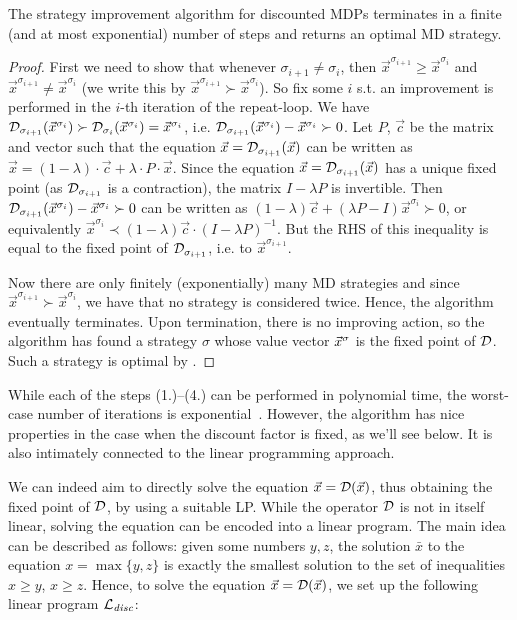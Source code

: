 \begin{theorem}
\label{5-thm:disc-strat-it}
The strategy improvement algorithm for discounted MDPs terminates in a finite (and at most exponential) number of steps and returns an optimal MD strategy.
\end{theorem}
\begin{proof}
First we need to show that whenever $\sigma_{i+1}\neq \sigma_i$, then  $\vec{x}^{\sigma_{i+1}} \geq \vec{x}^{\sigma_i}$ and $\vec{x}^{\sigma_{i+1}} \neq \vec{x}^{\sigma_i}$ (we write this by $\vec{x}^{\sigma_{i+1}} \succ\vec{x}^{\sigma_i}$). So fix some $ i $ s.t. an improvement is performed in the $ i $-th iteration of the repeat-loop. We have $\mathcal{D}_{\sigma_{i+1}}(\vec{x}^{\sigma_i})\succ\mathcal{D}_{\sigma_{i}}(\vec{x}^{\sigma_i})= \vec{x}^{\sigma_i}$, i.e. $\mathcal{D}_{\sigma_{i+1}}(\vec{x}^{\sigma_i})-\vec{x}^{\sigma_i} \succ 0$. Let $P$, $\vec{c}$ be the matrix and vector such that the equation $\vec{x}=\mathcal{D}_{\sigma_{i+1}}(\vec{x})$ can be written as $\vec{x}= (1-\lambda)\cdot \vec{c}+\lambda \cdot P\cdot\vec{x}$. Since the equation $\vec{x}=\mathcal{D}_{\sigma_{i+1}}(\vec{x})$ has a unique fixed point (as $ \mathcal{D}_{\sigma_{i+1}} $ is a contraction), the matrix $ I-\lambda P $ is invertible. Then $\mathcal{D}_{\sigma_{i+1}}(\vec{x}^{\sigma_i})-\vec{x}^{\sigma_i} \succ 0$ can be written as  $(1-\lambda)\vec{c} + (\lambda P - I)\vec{x}^{\sigma_i} \succ 0 $, or equivalently $\vec{x}^{\sigma_i}\prec (1-\lambda)\vec{c}\cdot(I-\lambda P)^{-1}.$ But the RHS of this inequality is equal to the fixed point of $\mathcal{D}_{\sigma_{i+1}}$, i.e. to $\vec{x}^{\sigma_{i+1}} .$

Now there are only finitely (exponentially) many MD strategies and since$\vec{x}^{\sigma_{i+1}} \succ\vec{x}^{\sigma_i}$, we have that no strategy is considered twice. Hence, the algorithm eventually terminates. Upon termination, there is no improving action, so the algorithm has found a strategy $\sigma$ whose value vector $\vec{x}^{\sigma}$ is the fixed point of $\mathcal{D}$. Such a strategy is optimal by . 
\end{proof}


While each of the steps (1.)--(4.) can be performed in polynomial time, the 
worst-case number of iterations is exponential~\cite{Hollanders&Delvenne&Jungers:2012}. However, the 
algorithm has nice properties in the case when the discount factor is fixed, as we'll see below. It is also intimately connected to the linear programming approach.

We can indeed aim to directly solve 
the equation $\vec{x} = \mathcal{D}(\vec{x})$, thus obtaining the fixed point of 
$\mathcal{D}$, by using a suitable LP. While the operator $\mathcal{D}$ is not 
in itself linear, solving the equation can be encoded into a linear  program. 
The main idea can be described as follows: given some numbers $y,z$, the 
solution $\bar{x}$ to the equation $x=\max\{y,z\}$ is exactly the smallest 
solution to the set of inequalities $x\geq y$, $x\geq z$. Hence, to solve the 
equation  $\vec{x} = \mathcal{D}(\vec{x})$, we set up the following linear program 
$\mathcal{L}_{\mathit{disc}}$:
\vspace{-1em}

